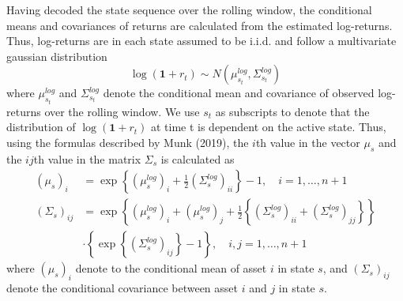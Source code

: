 Having decoded the state sequence over the rolling window, the conditional means and covariances of returns are calculated from the estimated log-returns. Thus, log-returns are in each state assumed to be i.i.d. and follow a multivariate gaussian distribution
\begin{equation}
    \log(\mathbf{1}+ r_t) \sim N\left(\mu_{s_t}^{log}, \Sigma_{s_t}^{log}  \right)
\end{equation}
where $\mu_{s_t}^{log}$ and $\Sigma_{s_t}^{log}$ denote the conditional mean and covariance of observed log-returns over the rolling window. We use $s_t$ as subscripts to denote that the distribution of $\log(\mathbf{1}+ r_t)$ at time t is dependent on the active state. Thus, using the formulas described by Munk (2019), the $i$th value in the vector $\mu_s$ and the $ij$th value in the matrix $\Sigma_s$ is calculated as
\begin{align}
    (\mu_{s})_i &= \exp \left\{(\mu_{s}^{log})_i + \frac{1}{2}(\Sigma_{s}^{log})_{ii} \right\} - 1,
    \quad i = 1,\ldots, n+1
    \\
    (\Sigma_{s})_{ij} &= \exp \left\{(\mu_{s}^{log})_i + (\mu_{s}^{log})_j + \frac{1}{2}\left\{(\Sigma_{s}^{log})_{ii} + (\Sigma_{s}^{log})_{jj} \right\} \right\} \\
    &\cdot \left\{ \exp \left\{ (\Sigma_{s}^{log})_{ij} \right\} - 1 \right\} \nonumber
    , \quad i,j = 1,\ldots,n+1
\end{align}
where $(\mu_{s})_i$ denote to the conditional mean of asset $i$ in state $s$, and $(\Sigma_{s})_{ij}$ denote the conditional covariance between asset $i$ and $j$ in state $s$.

